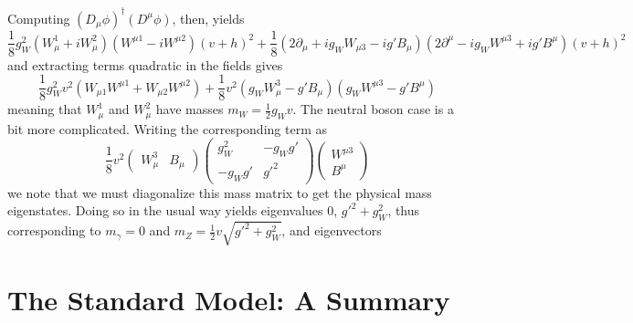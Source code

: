 Computing $(D_{\mu}\phi)^{\dagger}(D^{\mu}\phi)$, then, yields
\begin{equation}
\frac{1}{8}g_{W}^2(W_{\mu}^1+iW_{\mu}^2)(W^{\mu 1}-iW^{\mu 2})(v+h)^2 + 
\frac{1}{8}(2\partial_{\mu}+ig_{W}W_{\mu 3}-ig'B_{\mu})(2\partial^{\mu}-ig_{W}W^{\mu 3}+ig'B^{\mu})(v+h)^2
\end{equation}
and extracting terms quadratic in the fields gives
\begin{equation}
\frac{1}{8}g_{W}^2v^2(W_{\mu 1}W^{\mu 1}+W_{\mu 2}W^{\mu 2}) + \frac{1}{8}v^2(g_{W}W_{\mu}^3-g'B_{\mu})(g_{W}W^{\mu 3}-g'B^{\mu})
\end{equation}
meaning that $W_{\mu}^1$ and $W_{\mu}^2$ have masses $m_{W} = \frac{1}{2}g_{W}v$. The neutral boson case 
is a bit more complicated. Writing the corresponding term as
\begin{equation}
\frac{1}{8}v^2\begin{pmatrix}W_{\mu}^3&B_{\mu}\end{pmatrix} 
\begin{pmatrix}g_{W}^2 & -g_{W}g'\\-g_{W}g' & g'^2\end{pmatrix} 
\begin{pmatrix}W^{\mu 3}\\B^{\mu}\end{pmatrix}
\end{equation}
we note that we must diagonalize this mass matrix to get the physical mass eigenstates. Doing
so in the usual way yields eigenvalues $0$, $g'^2+g_{W}^2$, thus corresponding to $m_{\gamma} = 0$ 
and $m_{Z} =\frac{1}{2}v\sqrt{g'^2+g_{W}^2}$, and eigenvectors


\section{The Standard Model: A Summary}













